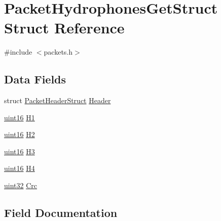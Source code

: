 \hypertarget{struct_packet_hydrophones_get_struct}{}\section{Packet\+Hydrophones\+Get\+Struct Struct Reference}
\label{struct_packet_hydrophones_get_struct}


{\ttfamily \#include $<$packets.\+h$>$}

\subsection*{Data Fields}
\begin{DoxyCompactItemize}
\item 
struct \hyperlink{struct_packet_header_struct}{Packet\+Header\+Struct} \hyperlink{struct_packet_hydrophones_get_struct_ab201af50281aff5ed4f984f994938007}{Header}
\item 
\hyperlink{_h_y_d_r_a_s_8_x_2types_8h_ac2a9e79eb120216f855626495b7bd18a}{uint16} \hyperlink{struct_packet_hydrophones_get_struct_aa6d402d310dab71d954b1b6cbd0b2b02}{H1}
\item 
\hyperlink{_h_y_d_r_a_s_8_x_2types_8h_ac2a9e79eb120216f855626495b7bd18a}{uint16} \hyperlink{struct_packet_hydrophones_get_struct_aae0827cfd9e8ce6e027d2bf915d503fc}{H2}
\item 
\hyperlink{_h_y_d_r_a_s_8_x_2types_8h_ac2a9e79eb120216f855626495b7bd18a}{uint16} \hyperlink{struct_packet_hydrophones_get_struct_ad8be5a1d7c1169b065c1ea5c50b830d1}{H3}
\item 
\hyperlink{_h_y_d_r_a_s_8_x_2types_8h_ac2a9e79eb120216f855626495b7bd18a}{uint16} \hyperlink{struct_packet_hydrophones_get_struct_ac714bf8e48d4cb87375ba99d72da2157}{H4}
\item 
\hyperlink{_h_y_d_r_a_s_8_x_2types_8h_acbd4acd0d29e2d6c43104827f77d9cd2}{uint32} \hyperlink{struct_packet_hydrophones_get_struct_a1aaa4998291cff4c19ca5cca4b1e9489}{Crc}
\end{DoxyCompactItemize}


\subsection{Field Documentation}
\hypertarget{struct_packet_hydrophones_get_struct_a1aaa4998291cff4c19ca5cca4b1e9489}{}
